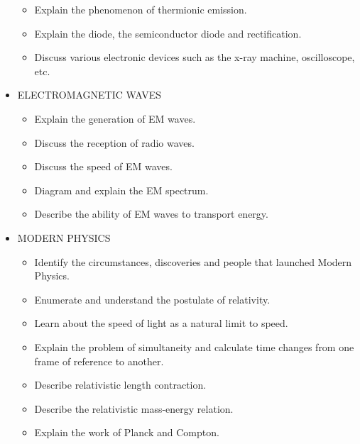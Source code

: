 \documentclass{article}
\begin{document}
\begin{itemize}
\begin{itemize}
\item Explain the phenomenon of thermionic emission.

\item Explain the diode, the semiconductor diode and rectification.

\item Discuss various electronic devices such as the x-ray machine, oscilloscope, etc.

\end{itemize}

\item ELECTROMAGNETIC WAVES
%
\begin{itemize}

\item Explain the generation of EM waves.

\item Discuss the reception of radio waves.

\item Discuss the speed of EM waves.

\item Diagram and explain the EM spectrum.

\item Describe the ability of EM waves to transport energy.

\end{itemize}

\item MODERN PHYSICS
%
\begin{itemize}

\item Identify the circumstances, discoveries and people that launched Modern Physics.

\item Enumerate and understand the postulate of relativity.

\item Learn about the speed of light as a natural limit to speed.

\item Explain the problem of simultaneity and calculate time changes from one frame of reference to another.

\item Describe relativistic length contraction.

\item Describe the relativistic mass-energy relation.

\item Explain the work of Planck and Compton.


\end{itemize}
\end{itemize}
\end{document}
